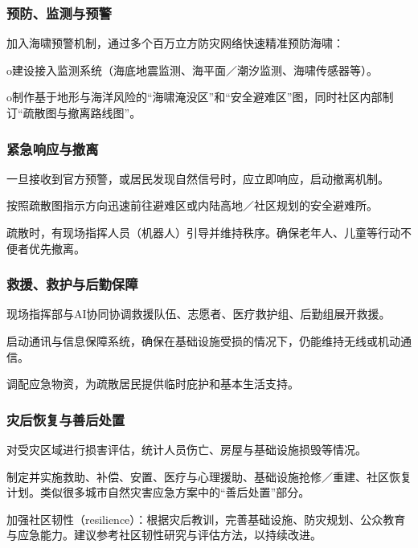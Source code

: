 \subsubsection{预防、监测与预警}\label{ux9884ux9632ux76d1ux6d4bux4e0eux9884ux8b66}

加入海啸预警机制，通过多个百万立方防灾网络快速精准预防海啸：

o建设接入监测系统（海底地震监测、海平面／潮汐监测、海啸传感器等）。

o制作基于地形与海洋风险的``海啸淹没区''和``安全避难区''图，同时社区内部制订``疏散图与撤离路线图''。

\subsubsection{紧急响应与撤离}\label{ux7d27ux6025ux54cdux5e94ux4e0eux64a4ux79bb}

一旦接收到官方预警，或居民发现自然信号时，应立即响应，启动撤离机制。

按照疏散图指示方向迅速前往避难区或内陆高地／社区规划的安全避难所。

疏散时，有现场指挥人员（机器人）引导并维持秩序。确保老年人、儿童等行动不便者优先撤离。

\subsubsection{救援、救护与后勤保障}\label{ux6551ux63f4ux6551ux62a4ux4e0eux540eux52e4ux4fddux969c}

现场指挥部与AI协同协调救援队伍、志愿者、医疗救护组、后勤组展开救援。

启动通讯与信息保障系统，确保在基础设施受损的情况下，仍能维持无线或机动通信。

调配应急物资，为疏散居民提供临时庇护和基本生活支持。

\subsubsection{灾后恢复与善后处置}\label{ux707eux540eux6062ux590dux4e0eux5584ux540eux5904ux7f6e}

对受灾区域进行损害评估，统计人员伤亡、房屋与基础设施损毁等情况。

制定并实施救助、补偿、安置、医疗与心理援助、基础设施抢修／重建、社区恢复计划。类似很多城市自然灾害应急方案中的``善后处置''部分。

加强社区韧性（resilience）：根据灾后教训，完善基础设施、防灾规划、公众教育与应急能力。建议参考社区韧性研究与评估方法，以持续改进。

